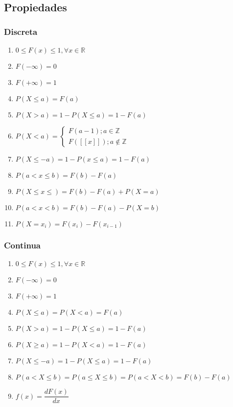 \documentclass[10pt,letterpaper]{article}
\begin{document}
\subsection{Propiedades}
\begin{multicols}{2}
\subsubsection{Discreta}
\begin{enumerate}
\item $0\leq F(x) \leq 1, \forall x\in \mathbb{R}$
\item $F(-\infty)=0$
\item $F(+\infty)=1$
\item $P(X\leq a)=F(a)$
\item $P(X>a)=1-P(X\leq a)=1-F(a)$
\item $P(X<a)=
\begin{cases}
F(a-1); a\in\mathbb{Z} \\
F( [\![ x ]\!] ) ; a \notin \mathbb{Z}
\end{cases}$
\item $P(X\leq -a)=1-P(x\leq a)=1-F(a)$
\item $P(a<x\leq b)=F(b)-F(a)$
\item $P(X\leq x\leq)=F(b)-F(a)+P(X=a)$
\item $P(a<x<b)=F(b)-F(a)-P(X=b)$
\item $P(X=x_i)=F(x_i)-F(x_{i-1})$
\end{enumerate}
\columnbreak
\subsubsection{Continua}
\begin{enumerate}
\item $0\leq F(x) \leq 1, \forall x\in \mathbb{R}$
\item $F(-\infty)=0$
\item $F(+\infty)=1$
\item $P(X\leq a)=P(X<a)=F(a)$
\item $P(X>a)=1-P(X\leq a)=1-F(a)$
\item $P(X\geq a)=1-P(X<a)=1-F(a)$
\item $P(X\leq -a)=1-P(X\leq a)=1-F(a)$
\item $P(a<X\leq b)=P(a\leq X\leq b)=P(a<X<b)=F(b)-F(a)$
\item $f(x)=\dfrac{dF(x)}{dx}$
\end{enumerate}
\end{multicols}
\pagebreak
\end{document}
